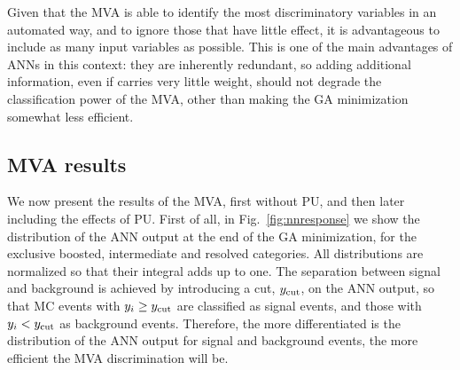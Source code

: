 Given that the MVA is able to identify the most discriminatory variables
in an automated way,
and to ignore those that have little effect, it is advantageous to
include as many input variables as possible.
%
This is one of the main advantages of ANNs in this context: they are
inherently redundant, so
adding additional information, even if carries very little weight,
should not degrade
the classification power of the MVA, other than making the GA
minimization somewhat less efficient.

\subsection{MVA results}
\label{sec:signalsignificance}

We now present the results of the MVA, first without PU, and then
later including the effects of PU.
%
First of all, in Fig.~\ref{fig:nnresponse} we show the distribution of
the ANN output at the end of the GA minimization, for the exclusive
boosted, intermediate and resolved categories.
%
All distributions are normalized so that their integral
  adds up to one.
%
The  separation between signal and background is achieved by introducing
a cut, $y_{\rm cut}$, on the ANN output, so that MC events with $y_i\ge
y_{\rm cut}$ are classified as signal events, and those with
 $y_i <
y_{\rm cut}$ as background events.
%
Therefore,
the more differentiated is the distribution of the ANN output
for signal and background events, the more efficient
the MVA discrimination will be.

